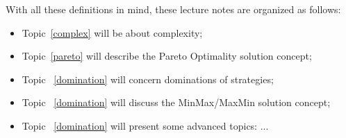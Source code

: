 \begin{Topic}[Introduction]
With all these definitions in mind, these lecture notes are organized as follows: 
\begin{itemize}
\item Topic~\ref{complex} will be about complexity;
\item Topic~\ref{pareto} will describe the Pareto Optimality solution concept;
\item Topic ~\ref{domination} will concern dominations of strategies;
\item Topic ~\ref{domination} will discuss the MinMax/MaxMin solution concept;
\item Topic ~\ref{domination} will present some advanced topics: ... 
\end{itemize}

\label{introduction}
\end{Topic}


